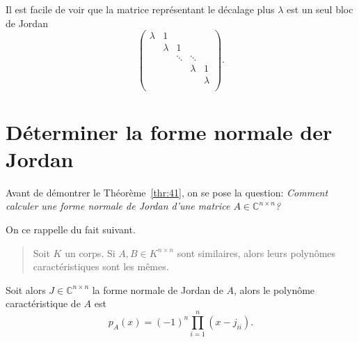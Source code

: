 Il est facile de voir que la matrice représentant le décalage plus $λ$ est 
un seul bloc de Jordan 
\begin{displaymath}
 \begin{pmatrix}
      λ & 1 \\
        & λ & 1 \\
        &   & \ddots & \ddots \\ 
        &   &             & λ & 1 \\
        &   &         &  & λ  \\
    \end{pmatrix}.   
\end{displaymath}




\section{Déterminer la forme normale der Jordan}
\label{sec:determiner-la-forme}

\noindent 
Avant de démontrer le Théorème~\ref{thr:41}, on se pose la question: \emph{Comment calculer une forme normale de Jordan d'une matrice $A ∈ ℂ^{n×n}$?}

On ce rappelle du fait suivant.
\begin{quote}
  Soit $K$ un corps. Si $A ,B ∈ K^{n ×n}$ sont similaires, alors leurs polynômes caractéristiques sont les mêmes. 
\end{quote}

\noindent 
Soit alors $J ∈ ℂ^{n ×n}$ la forme normale de Jordan de $A$, alors le polynôme caractéristique de $A$ est
\begin{equation}
  \label{eq:57}
  p_A(x) = (-1)^n ∏_{i=1}^n (x - j_{ii}). 
\end{equation}


